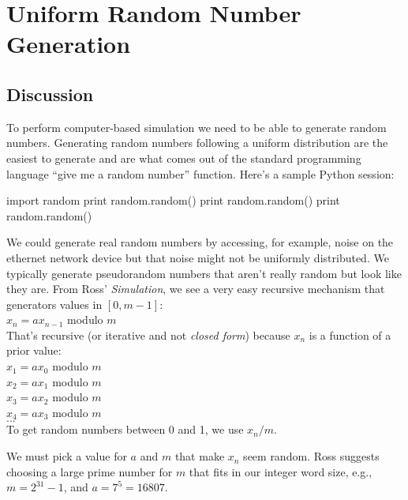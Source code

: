 \chapter{Uniform Random Number Generation}

\setcounter{problem}{1}
\section{Discussion}

\begin{fullwidth}

To perform computer-based simulation we need to be able to generate random numbers. Generating random numbers following a uniform distribution are the easiest to generate and are what comes out of the standard programming language ``give me a random number'' function.  Here's a sample Python session:

\begin{pyconsole}
import random
print random.random()
print random.random()
print random.random()
\end{pyconsole}

We could generate real random numbers by accessing, for example, noise on the ethernet network device but that noise might not be uniformly distributed. We typically generate pseudorandom numbers that aren't really random but look like they are. From Ross' {\em Simulation},  we see a very easy recursive mechanism that generators values in $[0,m-1]$:\\

$x_n = a x_{n-1}$ modulo $m$\\

That's recursive (or iterative and not {\em closed form}) because $x_n$ is a function of a prior value: \\

\noindent $x_1 = ax_0$ modulo $m$\\
$x_2 = ax_1$ modulo $m$\\
$x_3 = ax_2$ modulo $m$\\
$x_4 = ax_3$ modulo $m$\\
$...$\\

\noindent To get random numbers between 0 and 1, we use $x_n / m$.

We must pick a value for $a$ and $m$ that make $x_n$ seem random. Ross suggests choosing a large prime number for $m$ that fits in our integer word size, e.g., $m = 2^{31} - 1$, and $a = 7^5 = 16807$.


\end{fullwidth}
